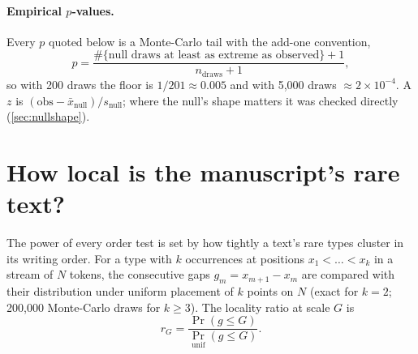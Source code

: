 \documentclass[11pt,a4paper]{article}
\newcommand{\pv}{p}
\begin{document}
\paragraph{Empirical $p$-values.} Every $p$ quoted below is a Monte-Carlo tail with the add-one convention,
\begin{equation}
\pv=\frac{\#\{\text{null draws at least as extreme as observed}\}+1}{n_{\text{draws}}+1},
\label{eq:pemp}
\end{equation}
so with 200 draws the floor is $1/201\approx 0.005$ and with 5,000 draws $\approx 2\times10^{-4}$. A $z$ is $(\text{obs}-\bar{x}_{\text{null}})/s_{\text{null}}$; where the null's shape matters it was checked directly (\cref{sec:nullshape}).

\section{How local is the manuscript's rare text?}
\label{sec:baseline}

The power of every order test is set by how tightly a text's rare types cluster in its writing order. For a type with $k$ occurrences at positions $x_1<\dots<x_k$ in a stream of $N$ tokens, the consecutive gaps $g_m=x_{m+1}-x_m$ are compared with their distribution under uniform placement of $k$ points on $N$ (exact for $k=2$; 200,000 Monte-Carlo draws for $k\ge3$). The locality ratio at scale $G$ is
\begin{equation}
r_G=\frac{\Pr(g\le G)}{\Pr_{\text{unif}}(g\le G)} .
\label{eq:rG}
\end{equation}
\end{document}
